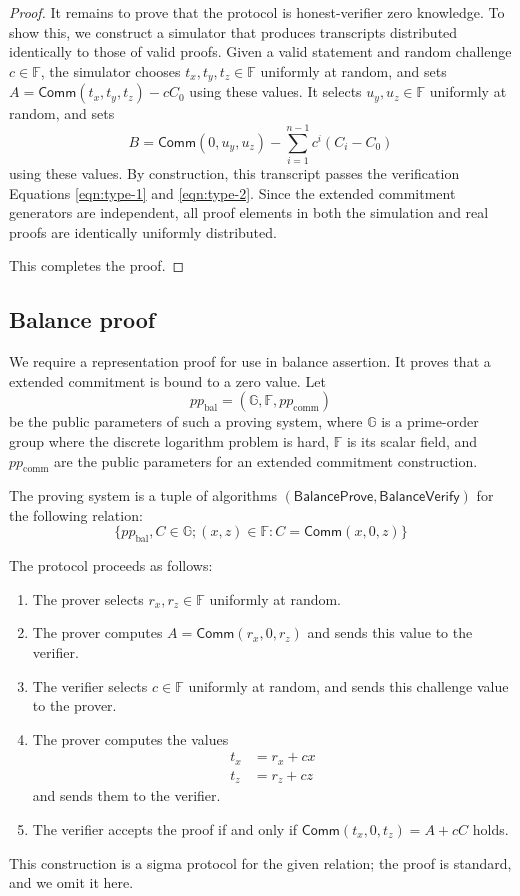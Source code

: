 \documentclass{article}
\newcommand{\G}{\mathbb{G}}
\newcommand{\F}{\mathbb{F}}
\newcommand{\func}[1]{\mathsf{#1}}
\newcommand{\comm}{\func{Comm}}
\begin{document}
\begin{proof}
It remains to prove that the protocol is honest-verifier zero knowledge.
To show this, we construct a simulator that produces transcripts distributed identically to those of valid proofs.
Given a valid statement and random challenge $c \in \F$, the simulator chooses $t_x, t_y, t_z \in \F$ uniformly at random, and sets $A = \comm(t_x, t_y, t_z) - cC_0$ using these values.
It selects $u_y, u_z \in \F$ uniformly at random, and sets
$$B = \comm(0, u_y, u_z) - \sum_{i=1}^{n-1} c^i(C_i - C_0)$$
using these values.
By construction, this transcript passes the verification Equations \ref{eqn:type-1} and \ref{eqn:type-2}.
Since the extended commitment generators are independent, all proof elements in both the simulation and real proofs are identically uniformly distributed.

This completes the proof.
\end{proof}


\subsection{Balance proof}

We require a representation proof for use in balance assertion.
It proves that a extended commitment is bound to a zero value.
Let $$pp_{\text{bal}} = (\G, \F, pp_{\text{comm}})$$ be the public parameters of such a proving system, where $\G$ is a prime-order group where the discrete logarithm problem is hard, $\F$ is its scalar field, and $pp_{\text{comm}}$ are the public parameters for an extended commitment construction.

The proving system is a tuple of algorithms $(\func{BalanceProve}, \func{BalanceVerify})$ for the following relation:
$$\{ pp_{\text{bal}}, C \in \G ; (x, z) \in \F : C = \comm(x, 0, z) \}$$

The protocol proceeds as follows:
\begin{enumerate}
    \item The prover selects $r_x, r_z \in \F$ uniformly at random.
    \item The prover computes $A = \comm(r_x, 0, r_z)$ and sends this value to the verifier.
    \item The verifier selects $c \in \F$ uniformly at random, and sends this challenge value to the prover.
    \item The prover computes the values
    \begin{align*}
        t_x &= r_x + cx \\
        t_z &= r_z + cz
    \end{align*}
    and sends them to the verifier.
    \item The verifier accepts the proof if and only if $\comm(t_x, 0, t_z) = A + cC$ holds.
\end{enumerate}
This construction is a sigma protocol for the given relation; the proof is standard, and we omit it here.
\end{document}

